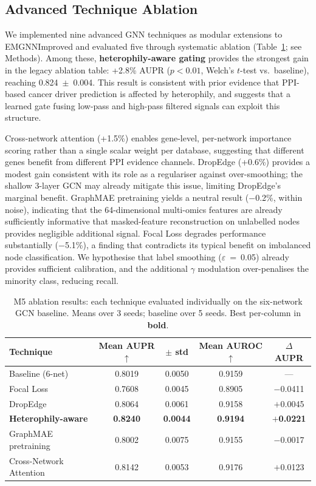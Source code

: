 \subsection{Advanced Technique Ablation}

We implemented nine advanced GNN techniques as modular extensions to EMGNNImproved
and evaluated five through systematic ablation (Table~\ref{tab:m5_ablation}; see
Methods). Among these, \textbf{heterophily-aware gating} provides the strongest
gain in the legacy ablation table: +2.8\% AUPR ($p<0.01$, Welch's $t$-test vs.\
baseline), reaching 0.824~$\pm$~0.004. This result is consistent with prior
evidence that PPI-based cancer driver prediction is affected by heterophily, and
suggests that a learned gate fusing low-pass and high-pass filtered signals can
exploit this structure\cite{sgcd2024}.

Cross-network attention (+1.5\%) enables gene-level, per-network importance
scoring rather than a single scalar weight per database, suggesting that different
genes benefit from different PPI evidence channels. DropEdge (+0.6\%) provides a
modest gain consistent with its role as a regulariser against over-smoothing; the
shallow 3-layer GCN may already mitigate this issue, limiting DropEdge's marginal
benefit. GraphMAE pretraining yields a neutral result ($-$0.2\%, within noise),
indicating that the 64-dimensional multi-omics features are already sufficiently
informative that masked-feature reconstruction on unlabelled nodes provides
negligible additional signal. Focal Loss degrades performance substantially
($-$5.1\%), a finding that contradicts its typical benefit on imbalanced node
classification. We hypothesise that label smoothing ($\varepsilon$~=~0.05) already
provides sufficient calibration, and the additional $\gamma$ modulation
over-penalises the minority class, reducing recall.

\begin{table}[ht]
  \centering
  \caption{M5 ablation results: each technique evaluated individually on the
           six-network GCN baseline. Means over 3 seeds; baseline over 5 seeds.
           Best per-column in \textbf{bold}.}
  \label{tab:m5_ablation}
  \small
  \begin{tabular}{lcccc}
    \toprule
    \textbf{Technique} & \textbf{Mean AUPR $\uparrow$} & \textbf{$\pm$ std} & \textbf{Mean AUROC $\uparrow$} & \textbf{$\Delta$ AUPR} \\
    \midrule
    Baseline (6-net)        & 0.8019 & 0.0050 & 0.9159 & ---     \\
    Focal Loss              & 0.7608 & 0.0045 & 0.8905 & $-$0.0411 \\
    DropEdge                & 0.8064 & 0.0061 & 0.9158 & $+$0.0045 \\
    \rowcolor{blue!8} \textbf{Heterophily-aware} & \textbf{0.8240} & \textbf{0.0044} & \textbf{0.9194} & \textbf{$+$0.0221} \\
    GraphMAE pretraining    & 0.8002 & 0.0075 & 0.9155 & $-$0.0017 \\
    Cross-Network Attention & 0.8142 & 0.0053 & 0.9176 & $+$0.0123 \\
    \bottomrule
  \end{tabular}
\end{table}

